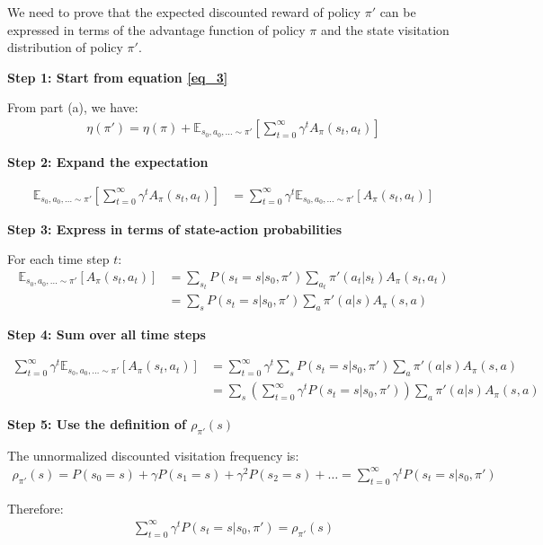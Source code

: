 We need to prove that the expected discounted reward of policy $\pi'$ can be expressed in terms of the advantage function of policy $\pi$ and the state visitation distribution of policy $\pi'$.

\textbf{Step 1: Start from equation \ref{eq_3}}

From part (a), we have:
\begin{align}
\eta(\pi') = \eta(\pi) + \mathbb{E}_{s_{0}, a_{0}, \ldots \sim \pi'} \left[ \sum_{t = 0}^{\infty} \gamma^t A_\pi(s_t, a_t) \right]
\end{align}

\textbf{Step 2: Expand the expectation}

\begin{align}
\mathbb{E}_{s_{0}, a_{0}, \ldots \sim \pi'} \left[ \sum_{t = 0}^{\infty} \gamma^t A_\pi(s_t, a_t) \right] &= \sum_{t = 0}^{\infty} \gamma^t \mathbb{E}_{s_{0}, a_{0}, \ldots \sim \pi'} [A_\pi(s_t, a_t)]
\end{align}

\textbf{Step 3: Express in terms of state-action probabilities}

For each time step $t$:
\begin{align}
\mathbb{E}_{s_{0}, a_{0}, \ldots \sim \pi'} [A_\pi(s_t, a_t)] &= \sum_{s_t} P(s_t = s | s_0, \pi') \sum_{a_t} \pi'(a_t | s_t) A_\pi(s_t, a_t) \\
&= \sum_{s} P(s_t = s | s_0, \pi') \sum_{a} \pi'(a | s) A_\pi(s, a)
\end{align}

\textbf{Step 4: Sum over all time steps}

\begin{align}
\sum_{t = 0}^{\infty} \gamma^t \mathbb{E}_{s_{0}, a_{0}, \ldots \sim \pi'} [A_\pi(s_t, a_t)] &= \sum_{t = 0}^{\infty} \gamma^t \sum_{s} P(s_t = s | s_0, \pi') \sum_{a} \pi'(a | s) A_\pi(s, a) \\
&= \sum_{s} \left( \sum_{t = 0}^{\infty} \gamma^t P(s_t = s | s_0, \pi') \right) \sum_{a} \pi'(a | s) A_\pi(s, a)
\end{align}

\textbf{Step 5: Use the definition of $\rho_{\pi'}(s)$}

The unnormalized discounted visitation frequency is:
\begin{align}
\rho_{\pi'}(s) = P(s_0 = s) + \gamma P(s_1 = s) + \gamma^2 P(s_2 = s) + \ldots = \sum_{t = 0}^{\infty} \gamma^t P(s_t = s | s_0, \pi')
\end{align}

Therefore:
\begin{align}
\sum_{t = 0}^{\infty} \gamma^t P(s_t = s | s_0, \pi') = \rho_{\pi'}(s)
\end{align}


